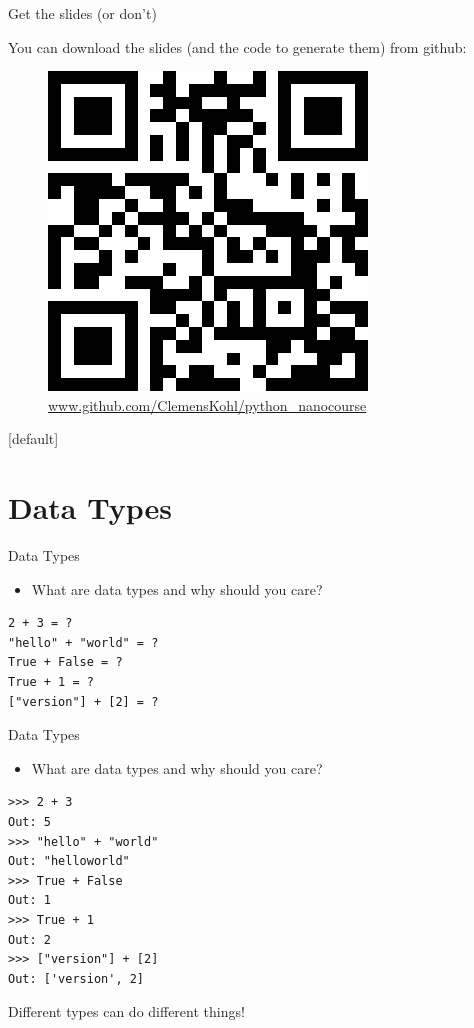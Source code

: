 \documentclass[compress%
,aspectratio=169%
]{beamer}
\begin{document}
\begin{frame}{Get the slides (or don't)}

You can download the slides (and the code to generate them) from github:
    \begin{figure}
    \centering
    \includegraphics[width = 0.3\linewidth]{img/github.png}
    \caption{\alert{\url{www.github.com/ClemensKohl/python_nanocourse}}}
    \end{figure}
    
\end{frame}
[default]


\section{Data Types}

\begin{frame}[fragile]{Data Types}

    \begin{itemize}
        \item What are data types and why should you care?
    \end{itemize}
\begin{lstlisting}[language=iPython]
2 + 3 = ?
"hello" + "world" = ?
True + False = ?
True + 1 = ?
["version"] + [2] = ?
\end{lstlisting}
    
\end{frame}

\begin{frame}[fragile]{Data Types}

    \begin{itemize}
        \item What are data types and why should you care?
    \end{itemize}
\begin{lstlisting}
>>> 2 + 3
Out: 5
>>> "hello" + "world"
Out: "helloworld"
>>> True + False
Out: 1
>>> True + 1
Out: 2
>>> ["version"] + [2]
Out: ['version', 2]
\end{lstlisting}
Different types can do different things!
\end{frame}
\end{document}
